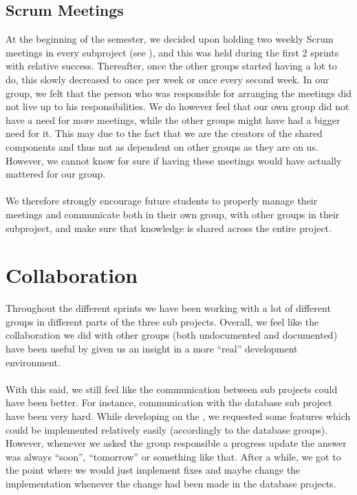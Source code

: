\subsection{Scrum Meetings} 
At the beginning of the semester, we decided upon holding two weekly Scrum meetings in every subproject (see ), and this was held during the first 2 sprints with relative success. Thereafter, once the other groups started having a lot to do, this slowly decreased to once per week or once every second week. In our group, we felt that the person who was responsible for arranging the meetings did not live up to his responsibilities.  We do however feel that our own group did not have a need for more meetings, while the other groups might have had a bigger need for it. This may due to the fact that we are the creators of the shared components and thus not as dependent on other groups as they are on us. However, we cannot know for sure if having these meetings would have actually mattered for our group. 
\\\\ 
We therefore strongly encourage future students to properly manage their meetings and communicate both in their own group, with other groups in their subproject, and make sure that knowledge is shared across the entire project. 

\section{Collaboration}
Throughout the different sprints we have been working with a lot of different groups in different parts of the three sub projects. Overall, we feel like the collaboration we did with other groups (both undocumented and documented) have been useful by given us an insight in a more ``real'' development environment.
\\\\
With this said, we still feel like the communication between sub projects could have been better. For instance, communication with the database sub project have been very hard. While developing on the \ct, we requested some features which could be implemented relatively easily (accordingly to the database groups). However, whenever we asked the group responsible a progress update the answer was always ``soon'', ``tomorrow'' or something like that. After a while, we got to the point where we would just implement fixes and maybe change the implementation whenever the change had been made in the database projects. 

